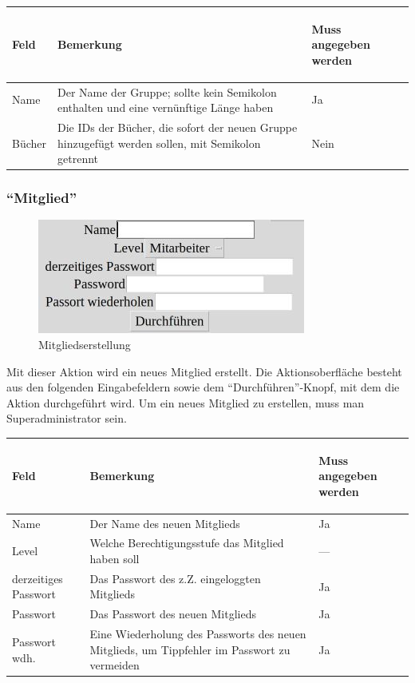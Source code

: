 \begin{tabular}{|p{}|p{}|p{}|}\hline
\begin{center}Feld\end{center} & \begin{center}Bemerkung\end{center} & \begin{center}Muss angegeben werden\end{center}\\
\hline
Name & Der Name der Gruppe; sollte kein Semikolon enthalten und eine vernünftige Länge haben & Ja\\
\hline
Bücher & Die IDs der Bücher, die sofort der neuen Gruppe hinzugefügt werden sollen, mit Semikolon getrennt & Nein\\
\hline
\end{tabular}

\subsubsection{``Mitglied''}
\label{subsubsec:detail:new:member}
\begin{figure}\includegraphics{images/gui2/new_member.jpg}\caption{Mitgliedserstellung}\label{fig:new_member}\end{figure}

Mit dieser Aktion wird ein neues Mitglied erstellt. Die Aktionsoberfläche besteht aus den folgenden Eingabefeldern sowie dem ``Durchführen''-Knopf, mit dem die Aktion durchgeführt wird.
Um ein neues Mitglied zu erstellen, muss man Superadministrator sein.

	\begin{tabular}{|p{}|p{}|p{}|}\hline
\begin{center}Feld\end{center} & \begin{center}Bemerkung\end{center} & \begin{center}Muss angegeben werden\end{center}\\
\hline
Name & Der Name des neuen Mitglieds & Ja\\
\hline
Level & Welche Berechtigungsstufe das Mitglied haben soll &  ---\\
\hline
derzeitiges Passwort & Das Passwort des z.Z. eingeloggten Mitglieds & Ja\\
\hline
Passwort & Das Passwort des neuen Mitglieds & Ja\\
\hline
Passwort wdh. & Eine Wiederholung des Passworts des neuen Mitglieds, um Tippfehler im Passwort zu vermeiden & Ja\\
\hline
\end{tabular}

